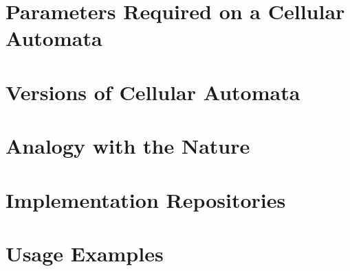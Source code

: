 \documentclass[9pt,a4paper,twoside]{tau-class/tau}
\begin{document}
\section{Parameters Required on a Cellular Automata}

\section{Versions of Cellular Automata}

\section{Analogy with the Nature}
    
\section{Implementation Repositories}

\section{Usage Examples}


\printbibliography
\end{document}
